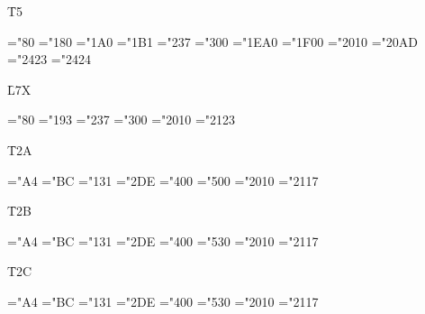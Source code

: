 {\f T5}

\TfiveZZZRegular
\ChrA="80 \ChrB="180
\PrintCode
\ChrA="1A0 \ChrB="1B1
\PrintCode
\ChrA="237 \ChrB="300
\PrintCode
\ChrA="1EA0 \ChrB="1F00
\PrintCode
\ChrA="2010 \ChrB="20AD
\PrintCode
\ChrA="2423 \ChrB="2424
\PrintCode

{\f L7X}

\LsvnXZZZRegular
\ChrA="80 \ChrB="193
\PrintCode
\ChrA="237 \ChrB="300
\PrintCode
\ChrA="2010 \ChrB="2123
\PrintCode

{\f T2A}

\TtwoaZZZRegular
\ChrA="A4 \ChrB="BC
\PrintCode
\ChrA="131 \ChrB="2DE
\PrintCode
\ChrA="400 \ChrB="500
\PrintCode
\ChrA="2010 \ChrB="2117
\PrintCode

{\f T2B}

\TtwobZZZRegular
\ChrA="A4 \ChrB="BC
\PrintCode
\ChrA="131 \ChrB="2DE
\PrintCode
\ChrA="400 \ChrB="530
\PrintCode
\ChrA="2010 \ChrB="2117
\PrintCode

{\f T2C}

\TtwocZZZRegular
\ChrA="A4 \ChrB="BC
\PrintCode
\ChrA="131 \ChrB="2DE
\PrintCode
\ChrA="400 \ChrB="530
\PrintCode
\ChrA="2010 \ChrB="2117
\PrintCode

\bye
